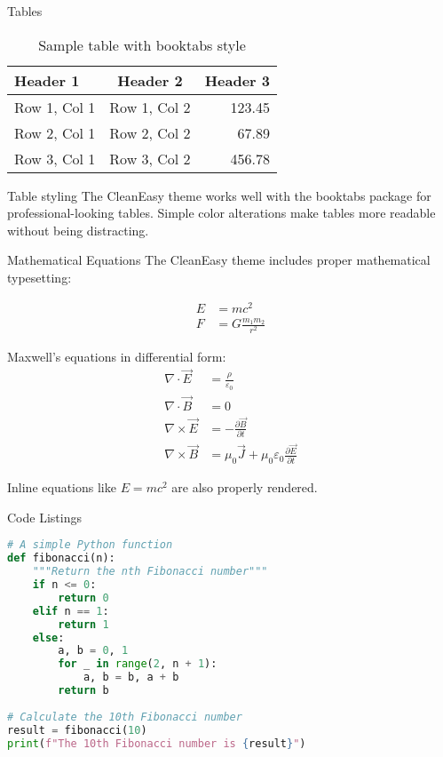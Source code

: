 \documentclass[aspectratio=169,xcolor=dvipsnames]{beamer}
\begin{document}
\begin{frame}{Tables}
  \begin{table}
    \centering
    \caption{Sample table with booktabs style}
    \begin{tabular}{lcr}
      \toprule
      \textbf{Header 1} & \textbf{Header 2} & \textbf{Header 3} \\
      \midrule
      Row 1, Col 1 & Row 1, Col 2 & 123.45 \\
      Row 2, Col 1 & Row 2, Col 2 & 67.89 \\
      Row 3, Col 1 & Row 3, Col 2 & 456.78 \\
      \bottomrule
    \end{tabular}
  \end{table}
  
  \vspace{0.5cm}
  
  \begin{block}{Table styling}
    The CleanEasy theme works well with the booktabs package for professional-looking tables. 
    Simple color alterations make tables more readable without being distracting.
  \end{block}
\end{frame}

\begin{frame}{Mathematical Equations}
  The CleanEasy theme includes proper mathematical typesetting:
  
  \begin{align}
    E &= mc^2 \\
    F &= G\frac{m_1 m_2}{r^2}
  \end{align}
  
  Maxwell's equations in differential form:
  \begin{align}
    \nabla \cdot \vec{E} &= \frac{\rho}{\varepsilon_0} \\
    \nabla \cdot \vec{B} &= 0 \\
    \nabla \times \vec{E} &= -\frac{\partial \vec{B}}{\partial t} \\
    \nabla \times \vec{B} &= \mu_0 \vec{J} + \mu_0\varepsilon_0\frac{\partial \vec{E}}{\partial t}
  \end{align}
  
  Inline equations like $E = mc^2$ are also properly rendered.
\end{frame}

\begin{frame}[fragile]{Code Listings}
  \begin{lstlisting}[language=Python]
# A simple Python function
def fibonacci(n):
    """Return the nth Fibonacci number"""
    if n <= 0:
        return 0
    elif n == 1:
        return 1
    else:
        a, b = 0, 1
        for _ in range(2, n + 1):
            a, b = b, a + b
        return b
  
# Calculate the 10th Fibonacci number
result = fibonacci(10)
print(f"The 10th Fibonacci number is {result}")
  \end{lstlisting}
\end{frame}
\end{document}
